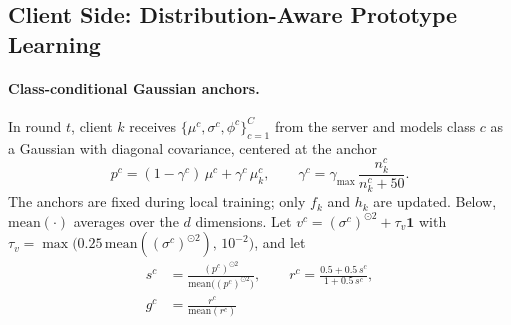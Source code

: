 
\subsection{Client Side: Distribution-Aware Prototype Learning}
\label{sec:client}
 
\paragraph{Class-conditional Gaussian anchors.}
In round $t$, client $k$ receives $\{\mu^c,\sigma^c,\phi^c\}_{c=1}^{C}$ from the server and models class $c$ as a Gaussian with diagonal covariance, centered at the anchor
\begin{equation}
  p^c=(1-\gamma^c)\,\mu^c+\gamma^c\,\mu_k^c,\qquad
  \gamma^c=\gamma_{\max}\,\frac{n_k^c}{n_k^c+50}.
\end{equation}
The anchors are fixed during local training; only $f_k$ and $h_k$ are updated. Below, $\mathrm{mean}(\cdot)$ averages over the $d$ dimensions. Let $v^c=(\sigma^c)^{\odot 2}+\tau_v\mathbf{1}$ with $\tau_v=\max\!\big(0.25\,\mathrm{mean}((\sigma^c)^{\odot 2}),\,10^{-2}\big)$, and let
\begin{equation}
\begin{aligned}
  s^c&=\frac{(p^c)^{\odot 2}}{\mathrm{mean}\big((p^c)^{\odot 2}\big)},\qquad
  r^c=\frac{0.5+0.5\,s^c}{1+0.5\,s^c},\\
  g^c&=\frac{r^c}{\mathrm{mean}(r^c)}
\end{aligned}
\end{equation}
